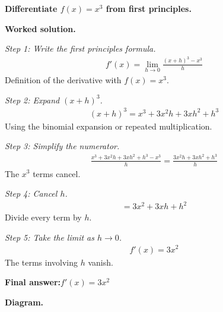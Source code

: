 \documentclass[11pt]{article}
\newcommand{\question}[1]{\par\medskip\noindent\textbf{#1}\par}
\begin{document}
\question{Differentiate \( f(x) = x^3 \) from first principles.}

\textbf{Worked solution.}

\textit{Step 1: Write the first principles formula.}
\[\begin{gathered}
f'(x) = \lim_{h \to 0} \frac{(x+h)^3 - x^3}{h}
\end{gathered}\]
Definition of the derivative with \( f(x) = x^3 \).

\textit{Step 2: Expand \( (x+h)^3 \).}
\[\begin{gathered}
(x+h)^3 = x^3 + 3x^2h + 3xh^2 + h^3
\end{gathered}\]
Using the binomial expansion or repeated multiplication.

\textit{Step 3: Simplify the numerator.}
\[\begin{gathered}
\frac{x^3 + 3x^2h + 3xh^2 + h^3 - x^3}{h} = \frac{3x^2h + 3xh^2 + h^3}{h}
\end{gathered}\]
The \( x^3 \) terms cancel.

\textit{Step 4: Cancel \( h \).}
\[\begin{gathered}
= 3x^2 + 3xh + h^2
\end{gathered}\]
Divide every term by \( h \).

\textit{Step 5: Take the limit as \( h \to 0 \).}
\[\begin{gathered}
f'(x) = 3x^2
\end{gathered}\]
The terms involving \( h \) vanish.

\begin{answerbox}
\textbf{Final answer:}\quad \(\displaystyle  f'(x) = 3x^2 \)
\end{answerbox}
\textbf{Diagram.}
\end{document}
